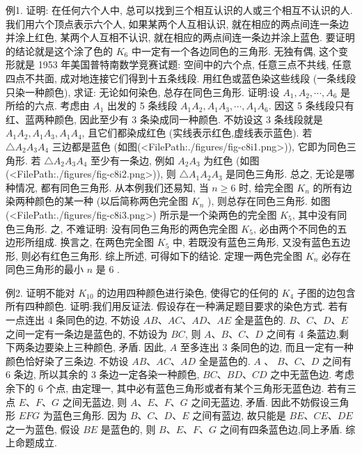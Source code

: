 例1. 证明: 在任何六个人中, 总可以找到三个相互认识的人或三个相互不认识的人.
我们用六个顶点表示六个人, 如果某两个人互相认识, 就在相应的两点间连一条边并涂上红色, 某两个人互相不认识, 就在相应的两点间连一条边并涂上蓝色.
要证明的结论就是这个涂了色的 $K_6$ 中一定有一个各边同色的三角形.
无独有偶, 这个变形就是 1953 年美国普特南数学竞赛试题: 空间中的六个点, 任意三点不共线, 任意四点不共面, 成对地连接它们得到十五条线段.
用红色或蓝色染这些线段 (一条线段只染一种颜色), 求证: 无论如何染色, 总存在同色三角形.
证明:设 $A_1, A_2, \cdots, A_6$ 是所给的六点.
考虑由 $A_1$ 出发的 5 条线段 $A_1 A_2, A_1 A_3, \cdots, A_1 A_6$. 因这 5 条线段只有红、蓝两种颜色, 因此至少有 3 条染成同一种颜色.
不妨设这 3 条线段就是 $A_1 A_2, A_1 A_3, A_1 A_4$, 且它们都染成红色 (实线表示红色,虚线表示蓝色). 若 $\triangle A_2 A_3 A_4$ 三边都是蓝色 (如图(<FilePath:./figures/fig-c8i1.png>)), 它即为同色三角形.
若 $\triangle A_2 A_3 A_4$ 至少有一条边, 例如 $A_2 A_3$ 为红色 (如图(<FilePath:./figures/fig-c8i2.png>)), 则 $\triangle A_1 A_2 A_3$ 是同色三角形.
总之, 无论是哪种情况, 都有同色三角形.
从本例我们还易知, 当 $n \geqslant 6$ 时, 给完全图 $K_n$ 的所有边染两种颜色的某一种 (以后简称两色完全图 $K_n$ ), 则总存在同色三角形.
如图(<FilePath:./figures/fig-c8i3.png>) 所示是一个染两色的完全图 $K_5$, 其中没有同色三角形.
之, 不难证明: 没有同色三角形的两色完全图 $K_5$, 必由两个不同色的五边形所组成.
换言之, 在两色完全图 $K_5$ 中, 若既没有蓝色三角形, 又没有蓝色五边形, 则必有红色三角形.
综上所述, 可得如下的结论.
定理一两色完全图 $K_n$ 必存在同色三角形的最小 $n$ 是 6 .



例2. 证明不能对 $K_{10}$ 的边用四种颜色进行染色, 使得它的任何的 $K_4$ 子图的边包含所有四种颜色.
证明:我们用反证法.
假设存在一种满足题目要求的染色方式.
若有一点连出 4 条同色的边, 不妨设 $A B 、 A C 、 A D 、 A E$ 全是蓝色的.
$B 、 C 、 D 、 E$ 之间一定有一条边是蓝色的, 不妨设为 $B C$, 则 $A 、 B 、 C 、 D$ 之间有 4 条蓝边,剩下两条边要染上三种颜色, 矛盾.
因此, $A$ 至多连出 3 条同色的边, 而且一定有一种颜色恰好染了三条边.
不妨设 $A B 、 A C 、 A D$ 全是蓝色的.
$A$ 、 $B 、 C 、 D$ 之间有 6 条边, 所以其余的 3 条边一定各染一种颜色, $B C 、 B D 、 C D$ 之中无蓝色边.
考虑余下的 6 个点, 由定理一, 其中必有蓝色三角形或者有某个三角形无蓝色边.
若有三点 $E 、 F 、 G$ 之间无蓝边, 则 $A 、 E 、 F 、 G$ 之间无蓝边, 矛盾.
因此不妨假设三角形 $E F G$ 为蓝色三角形.
因为 $B 、 C 、 D 、 E$ 之间有蓝边, 故只能是 $B E 、 C E 、 D E$ 之一为蓝色, 假设 $B E$ 是蓝色的, 则 $B 、 E 、 F 、 G$ 之间有四条蓝色边,同上矛盾.
综上命题成立.



